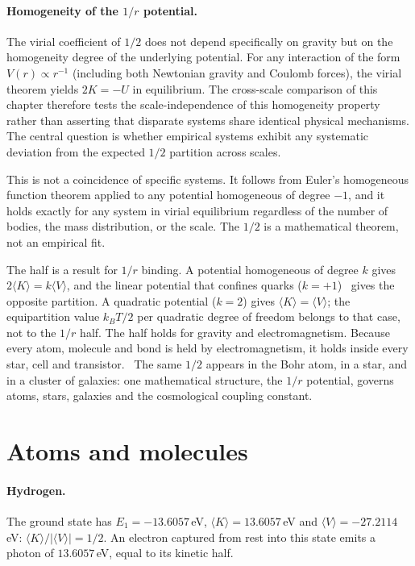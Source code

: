\paragraph{Homogeneity of the $1/r$ potential.} The virial coefficient of $1/2$ does not depend specifically on gravity but on the homogeneity degree of the
underlying potential. For any interaction of the form $V(r)\propto r^{-1}$ (including both Newtonian gravity and Coulomb forces), the virial theorem yields
$2K=-U$ in equilibrium. The cross-scale comparison of this chapter therefore tests the scale-independence of this homogeneity property rather than
asserting that disparate systems share identical physical mechanisms. The central question is whether empirical systems exhibit any systematic deviation
from the expected $1/2$ partition across scales. \derived

This is not a coincidence of specific systems. It follows from Euler's homogeneous function theorem applied to any potential homogeneous of degree $-1$,
and it holds exactly for any system in virial equilibrium regardless of the number of bodies, the mass distribution, or the scale. The $1/2$ is a
mathematical theorem, not an empirical fit. \derived

The half is a result for $1/r$ binding. A potential homogeneous of degree $k$ gives $2\langle K\rangle=k\langle V\rangle$, and the linear potential that
confines quarks ($k=+1$)~\cite{Eichten1978} gives the opposite partition. A quadratic potential ($k=2$) gives $\langle K\rangle=\langle V\rangle$; the
equipartition value $k_BT/2$ per quadratic degree of freedom belongs to that case, not to the $1/r$ half. The half holds for gravity and electromagnetism.
Because every atom, molecule and bond is held by electromagnetism, it holds inside every star, cell and transistor. \derived\ The same $1/2$ appears in the Bohr atom,
in a star, and in a cluster of galaxies: one mathematical structure, the $1/r$ potential, governs atoms, stars, galaxies and the cosmological coupling
constant. \prediction

\section{Atoms and molecules}\label{sec:vl_atoms}
\paragraph{Hydrogen.} The ground state has $E_1=-13.6057$\,eV, $\langle K\rangle=13.6057$\,eV and $\langle V\rangle=-27.2114$\,eV:
$\langle K\rangle/|\langle V\rangle|=1/2$. An electron captured from rest into this state emits a photon of $13.6057$\,eV, equal to its kinetic half. \calc


